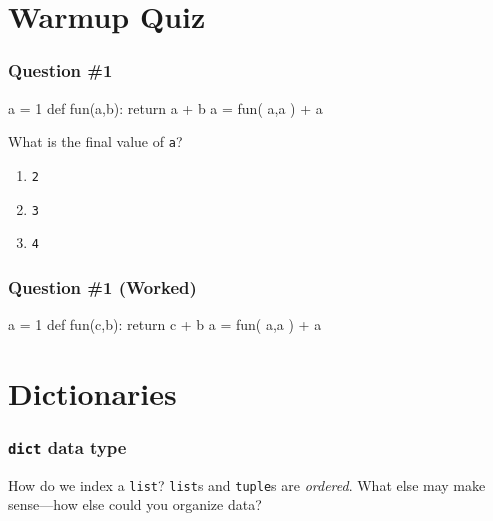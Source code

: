 \documentclass[11pt]{beamer}
\begin{document}
\section{Warmup Quiz}

\begin{frame}[fragile]
  \frametitle{Question \#1}
  \Enlarge

  \begin{semiverbatim}
a = 1
def fun(a,b):
    return a + b
a = fun( a,a ) + a
  \end{semiverbatim}
  What is the final value of \texttt{a}?
  \begin{enumerate}[label=\Alph*]
  \item  \texttt{2}
  \item  \texttt{3}
  \item  \texttt{4}
  \end{enumerate}
\end{frame}

\begin{frame}[fragile]
  \frametitle{Question \#1 (Worked)}
  \Enlarge

  \begin{semiverbatim}
a = 1
def fun(c,b):
    return c + b
a = fun( a,a ) + a
  \end{semiverbatim}
\end{frame}

\section{Dictionaries}

\begin{frame}[fragile]
  \frametitle{\texttt{dict} data type}
  \Enlarge

  \begin{itemize}
  \myitem  How do we index a \texttt{list}?
  \myitem  \texttt{list}s and \texttt{tuple}s are \emph{ordered}.
  \myitem  What else may make sense---how else could you organize data?
  \end{itemize}
\end{frame}
\end{document}
